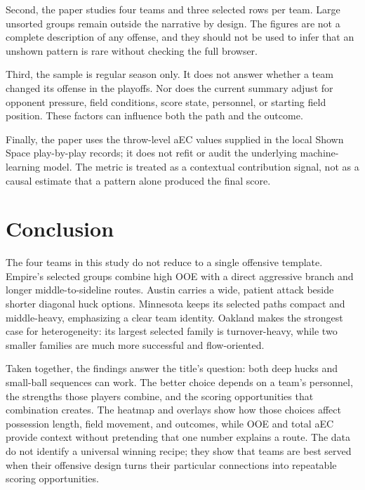 \documentclass[11pt]{article}
\newcommand{\aEC}{aEC}
\begin{document}
Second, the paper studies four teams and three selected rows per team. Large
unsorted groups remain outside the narrative by design. The figures are not a
complete description of any offense, and they should not be used to infer that
an unshown pattern is rare without checking the full browser.

Third, the sample is regular season only. It does not answer whether a team
changed its offense in the playoffs. Nor does the current summary adjust for
opponent pressure, field conditions, score state, personnel, or starting field
position. These factors can influence both the path and the outcome.

Finally, the paper uses the throw-level \aEC{} values supplied in the local
Shown Space play-by-play records; it does not refit or audit the underlying
machine-learning model. The metric is treated as a contextual contribution
signal, not as a causal estimate that a pattern alone produced the final score.

\section{Conclusion}

The four teams in this study do not reduce to a single offensive template.
Empire's selected groups combine high OOE with a direct aggressive branch and
longer middle-to-sideline routes. Austin carries a wide, patient attack beside
shorter diagonal huck options. Minnesota keeps its selected paths compact and
middle-heavy, emphasizing a clear team identity.
Oakland makes the strongest case for heterogeneity: its largest selected family
is turnover-heavy, while two smaller families are much more successful and
flow-oriented.

Taken together, the findings answer the title's question: both deep hucks and
small-ball sequences can work. The better choice depends on a team's personnel,
the strengths those players combine, and the scoring opportunities that
combination creates. The heatmap and overlays show how those choices affect
possession length, field movement, and outcomes, while OOE and total \aEC{}
provide context without pretending that one number explains a route. The data
do not identify a universal winning recipe; they show that teams are best served
when their offensive design turns their particular connections into repeatable
scoring opportunities.



\end{document}
